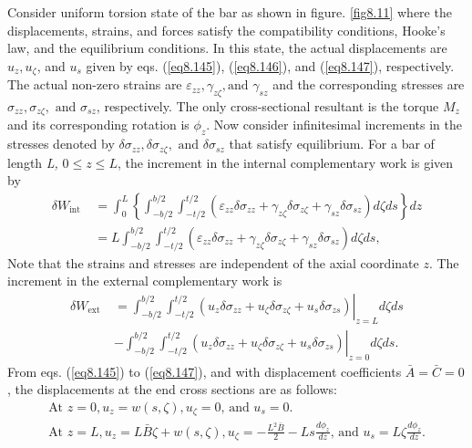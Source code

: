 \documentclass{AeroStructure-ERJohnson}
\begin{document}
Consider uniform torsion state of the bar as shown in
figure. \ref{fig8.11} where the displacements, strains, and forces satisfy
the compatibility conditions, Hooke's law, and the equilibrium
conditions. In this state, the actual displacements are $u_{z},
u_{\zeta}$, and $u_{s}$ given by eqs. (\ref{eq8.145}),
(\ref{eq8.146}), and (\ref{eq8.147}), respectively. The actual
non-zero strains are $\varepsilon_{z z}, \gamma_{z \zeta}, \text {
and } \gamma_{s z}$ and the corresponding stresses are $\sigma_{z
z}, \sigma_{z \zeta}, \text { and } \sigma_{s z}$, respectively.
The only cross-sectional resultant is the torque $M_{z}$ and its
corresponding rotation is $\phi_{z}$. Now consider infinitesimal
increments in the stresses denoted by $\delta \sigma_{z z}, \delta
\sigma_{z \zeta}, \text { and } \delta \sigma_{s z}$ that satisfy
equilibrium. For a bar of length \textit{L,} $0 \leq z \leq L$,
the increment in the internal complementary work is given by
\begin{align}\label{eq8.169}
\delta W_{\text {int }} &=
\int_{0}^{L}\left\{\int_{-b/ 2}^{b/ 2}
\int_{-t/2}^{t/ 2}
\left(\varepsilon_{z z} \delta \sigma_{z
z}+\gamma_{z \zeta} \delta \sigma_{z \zeta}+\gamma_{s z} \delta
\sigma_{s z}\right) d \zeta d s\right\} d z\nonumber\\
&=L
\int_{-b/ 2}^{b/ 2}\int_{-t/2}^{t/ 2} \left(\varepsilon_{z z} \delta
\sigma_{z z}+\gamma_{z \zeta} \delta \sigma_{z \zeta}+\gamma_{s z}
\delta \sigma_{s z}\right) d \zeta d s,
\end{align}
Note that the strains and stresses are independent of the axial
coordinate $z$. The increment in the external complementary work
is
\begin{align}\label{eq8.170}
\delta W_{\text {ext }} &=\left.
\int_{-b/ 2}^{b/ 2}\int_{-t/2}^{t/ 2}
\left(u_{z} \delta \sigma_{z z}+u_{\zeta}
\delta \sigma_{z \zeta}+u_{s} \delta \sigma_{z
s}\right)\right|_{z=L} d \zeta d s\nonumber\\
&-\left.\int_{-b/ 2}^{b/ 2}\int_{-t/2}^{t/ 2}\left(u_{z} \delta \sigma_{z z}+u_{\zeta} \delta \sigma_{z
\zeta}+u_{s} \delta \sigma_{z s}\right)\right|_{z=0} d \zeta d s.
\end{align}
From eqs. (\ref{eq8.145}) to (\ref{eq8.147}), and with
displacement coefficients $\bar{A}=\bar{C}=0$, the displacements
at the end cross sections are as follows:
\begin{gather}
\mbox{At }z=0, u_{z}=w(s, \zeta), u_{\zeta}=0\mbox{, and } u_{s}=0.\label{eq8.171}\\
\mbox{At }z=L, u_{z}=L \bar{B} \zeta+w(s, \zeta),
u_{\zeta}=-\frac{L^{2} \bar{B}}{2}-L s \frac{d \phi_{z}}{d z}\mbox{, and }u_{s}=L \zeta \frac{d \phi_{z}}{d z}.\label{eq8.172}
\end{gather}
\end{document}
